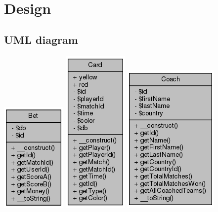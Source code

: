 \documentclass[11pt]{article}
\begin{document}
\section{Design}


\subsection{UML diagram}

\includegraphics[scale=0.4]{UML_Bet.png}
\includegraphics[scale=0.4]{UML_Card.png}
\includegraphics[scale=0.4]{UML_Coach.png}
\end{document}
